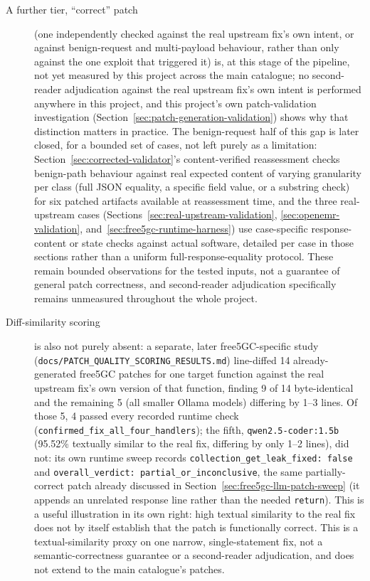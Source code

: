 \documentclass[12pt,a4paper]{report}
\begin{document}
\begin{description}
\item[A further tier, ``correct'' patch] (one independently checked against the real upstream fix's own intent, or against benign-request and multi-payload behaviour, rather than only against the one exploit that triggered it) is, at this stage of the pipeline, not yet measured by this project across the main catalogue; no second-reader adjudication against the real upstream fix's own intent is performed anywhere in this project, and this project's own patch-validation investigation (Section~\ref{sec:patch-generation-validation}) shows why that distinction matters in practice. The benign-request half of this gap is later closed, for a bounded set of cases, not left purely as a limitation: Section~\ref{sec:corrected-validator}'s content-verified reassessment checks benign-path behaviour against real expected content of varying granularity per class (full JSON equality, a specific field value, or a substring check) for six patched artifacts available at reassessment time, and the three real-upstream cases (Sections~\ref{sec:real-upstream-validation}, \ref{sec:openemr-validation}, and~\ref{sec:free5gc-runtime-harness}) use case-specific response-content or state checks against actual software, detailed per case in those sections rather than a uniform full-response-equality protocol. These remain bounded observations for the tested inputs, not a guarantee of general patch correctness, and second-reader adjudication specifically remains unmeasured throughout the whole project.

\item[Diff-similarity scoring] is also not purely absent: a separate, later free5GC-specific study (\texttt{docs/PATCH\_QUALITY\_SCORING\_RESULTS.md}) line-diffed 14 already-generated free5GC patches for one target function against the real upstream fix's own version of that function, finding 9 of 14 byte-identical and the remaining 5 (all smaller Ollama models) differing by 1--3 lines. Of those 5, 4 passed every recorded runtime check (\texttt{confirmed\_fix\_all\_four\_handlers}); the fifth, \texttt{qwen2.5-coder:1.5b} (95.52\% textually similar to the real fix, differing by only 1--2 lines), did not: its own runtime sweep records \texttt{collection\_get\_leak\_fixed: false} and \texttt{overall\_verdict: partial\_or\_inconclusive}, the same partially-correct patch already discussed in Section~\ref{sec:free5gc-llm-patch-sweep} (it appends an unrelated response line rather than the needed \texttt{return}). This is a useful illustration in its own right: high textual similarity to the real fix does not by itself establish that the patch is functionally correct. This is a textual-similarity proxy on one narrow, single-statement fix, not a semantic-correctness guarantee or a second-reader adjudication, and does not extend to the main catalogue's patches.


\end{description}
\end{document}
